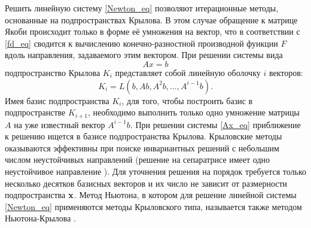 Решить линейную систему \eqref{Newton_eq} позволяют итерационные методы, основанные на подпространствах Крылова. В этом случае обращение к матрице Якоби происходит только в форме её умножения на вектор, что в соответствии с \eqref{fd_eq} сводится к вычислению конечно-разностной производной функции $F$ вдоль направления, задаваемого этим вектором. При решении системы вида
\begin{equation}\label{Ax_eq}
Ax = b
\end{equation}
подпространство Крылова $K_i$ представляет собой линейную оболочку $i$ векторов:
\begin{equation}\label{Ki_eq}
K_i = L(b, Ab, A^2b, \dots, A^{i-1}b).
\end{equation}
Имея базис подпространства $K_i$, для того, чтобы построить базис в подпространстве $K_{i+1}$, необходимо выполнить только одно умножение матрицы $A$ на уже известный вектор $A^{i-1}b$. При решении системы \eqref{Ax_eq} приближение к решению ищется в базисе подпространства Крылова. Крыловские методы оказываются эффективны при поиске инвариантных решений с небольшим числом неустойчивых направлений (решение на сепаратрисе имеет одно неустойчивое направление \cite{Avila2013}). Для уточнения решения на порядок требуется только несколько десятков базисных векторов и их число не зависит от размерности подпространства $\mathbf{x}$. Метод Ньютона, в котором для решение линейной системы \eqref{Newton_eq} применяются методы Крыловского типа, называется также методом Ньютона-Крылова \cite{Sanchez2004}. 

